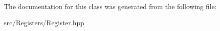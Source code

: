 The documentation for this class was generated from the following file\+:\begin{DoxyCompactItemize}
\item 
src/\+Registers/\mbox{\hyperlink{_register_8hpp}{Register.\+hpp}}\end{DoxyCompactItemize}
